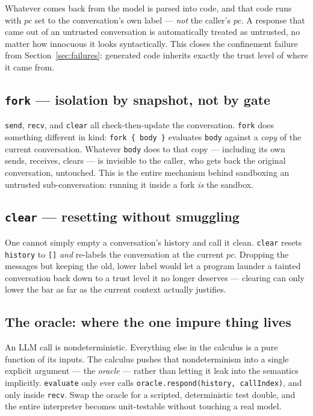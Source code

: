 \documentclass[11pt, a4paper]{article}
\begin{document}
\begin{descirption}
{Whatever comes back from the model is parsed into code, and that code
runs with $pc$ set to the conversation's own label --- \emph{not} the
caller's $pc$. A response that came out of an untrusted conversation is
automatically treated as untrusted, no matter how innocuous it looks
syntactically. This closes the confinement failure from
Section~\ref{sec:failures}: generated code inherits exactly the trust
level of where it came from.

\subsection{\texttt{fork} --- isolation by snapshot, not by gate}

\lstinline{send}, \lstinline{recv}, and \lstinline{clear} all check-then-update the
conversation. \lstinline{fork} does something different in kind:
\lstinline|fork { body }| evaluates \lstinline{body} against a \emph{copy}
of the current conversation. Whatever \lstinline{body} does to that copy
--- including its own sends, receives, clears --- is invisible to the
caller, who gets back the original conversation, untouched. This is the
entire mechanism behind sandboxing an untrusted sub-conversation: running
it inside a fork \emph{is} the sandbox.

\subsection{\texttt{clear} --- resetting without smuggling}

One cannot simply empty a conversation's history and call it clean.
\lstinline{clear} resets \lstinline{history} to \lstinline{[]} \emph{and}
re-labels the conversation at the current $pc$. Dropping the messages but
keeping the old, lower label would let a program launder a tainted
conversation back down to a trust level it no longer deserves --- clearing
can only lower the bar as far as the current context actually justifies.

\subsection{The oracle: where the one impure thing lives}

An LLM call is nondeterministic. Everything else in the calculus is a
pure function of its inputs. The calculus pushes that nondeterminism into
a single explicit argument --- the \emph{oracle} --- rather than letting
it leak into the semantics implicitly. \lstinline{evaluate} only ever
calls \lstinline{oracle.respond(history, callIndex)}, and only inside
\lstinline{recv}. Swap the oracle for a scripted, deterministic test
double, and the entire interpreter becomes unit-testable without touching
a real model.

}
\end{descirption}
\end{document}
